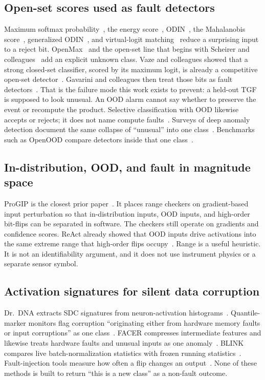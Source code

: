 \documentclass[preprint,12pt]{elsarticle}
\begin{document}
\subsection{Open-set scores used as fault detectors}

Maximum softmax probability~\cite{hendrycks2017}, the energy score~\cite{liu2020}, ODIN~\cite{liang2018}, the Mahalanobis score~\cite{lee2018}, generalized ODIN~\cite{hsu2020}, and virtual-logit matching~\cite{wang2022} reduce a surprising input to a reject bit. OpenMax~\cite{bendale2016} and the open-set line that begins with Scheirer and colleagues~\cite{scheirer2013,geng2021} add an explicit unknown class. Vaze and colleagues showed that a strong closed-set classifier, scored by its maximum logit, is already a competitive open-set detector~\cite{vaze2022}. Gavarini and colleagues then treat those bits as fault detectors~\cite{gavarini2022}. That is the failure mode this work exists to prevent: a held-out TGF is supposed to look unusual. An OOD alarm cannot say whether to preserve the event or recompute the product. Selective classification with OOD likewise accepts or rejects; it does not name compute faults~\cite{sirc2022,narasimhan2024}. Surveys of deep anomaly detection document the same collapse of ``unusual'' into one class~\cite{ruff2021}. Benchmarks such as OpenOOD compare detectors inside that one class~\cite{yang2022}.

\subsection{In-distribution, OOD, and fault in magnitude space}

ProGIP is the closest prior paper~\cite{progip2025}. It places range checkers on gradient-based input perturbation so that in-distribution inputs, OOD inputs, and high-order bit-flips can be separated in software. The checkers still operate on gradients and confidence scores. ReAct already showed that OOD inputs drive activations into the same extreme range that high-order flips occupy~\cite{react2021}. Range is a useful heuristic. It is not an identifiability argument, and it does not use instrument physics or a separate sensor symbol.

\subsection{Activation signatures for silent data corruption}

Dr.~DNA extracts SDC signatures from neuron-activation histograms~\cite{drdna2024}. Quantile-marker monitors flag corruption ``originating either from hardware memory faults or input corruptions'' as one class~\cite{geissler2023}. FACER compresses intermediate features and likewise treats hardware faults and unusual inputs as one anomaly~\cite{schorn2020}. BLINK compares live batch-normalization statistics with frozen running statistics~\cite{blink2026}. Fault-injection tools measure how often a flip changes an output~\cite{li2017,reagen2018,pytorchfi2020}. None of these methods is built to return ``this is a new class'' as a non-fault outcome.
\end{document}

